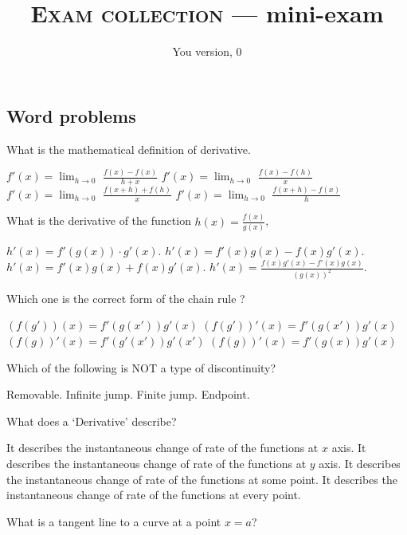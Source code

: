 \documentclass{exam}
\newcommand\myversion{0}
\begin{document}
\author{You version, \myversion}
\title{\textsc{Exam collection} --- mini-exam}


\maketitle


\begin{questions}

\section{Word problems}

	\question What is the mathematical definition of derivative.

	\begin{choices}
		\choice $f'(x) = \lim_{h\to 0}$ $\frac{f(x)-f(x)}{h+x}$
		\choice $f'(x) = \lim_{h\to 0}$ $\frac{f(x)-f(h)}{x}$
		\choice $f'(x) = \lim_{h\to 0}$ $\frac{f(x+h)+f(h)}{x}$
		\CorrectChoice $f'(x) = \lim_{h\to 0}$ $\frac{f(x+h)-f(x)}{h}$
	\end{choices}
	\question What is the derivative of the function $h(x) = \frac{f(x)}{g(x)}$,

	\begin{choices}
		\choice $h'(x) = f'(g(x)) \cdot g'(x).$
		\choice $h'(x) = f'(x)g(x)-f(x)g'(x).$
		\choice $h'(x) = f'(x)g(x)+f(x)g'(x).$
		\CorrectChoice $h'(x) = \frac{f(x)g'(x)-f'(x)g(x)}{(g(x))^2}.$
	\end{choices}

	\question Which one is the correct form of the chain rule ?

	\begin{choices}
		\choice $(f(g'))(x)=f'(g(x'))g'(x)$
		\choice $(f(g'))'(x)=f'(g(x'))g'(x)$
		\choice $(f(g))'(x)=f'(g'(x'))g'(x')$
		\CorrectChoice $(f(g))'(x)=f'(g(x))g'(x)$
	\end{choices}

	\question Which of the following is NOT a type of discontinuity?

	\begin{choices}
		\choice Removable.
		\choice Infinite jump.
		\choice Finite jump.
		\CorrectChoice Endpoint.
	\end{choices}

	\question What does a `Derivative' describe?
	\begin{choices}
		\choice It describes the instantaneous change of rate of the functions at $x$ axis.
		\choice It describes the instantaneous change of rate of the functions at $y$ axis.
		\choice It describes the instantaneous change of rate of the functions at some point.
		\CorrectChoice It describes the instantaneous change of rate of the functions at every point.
	\end{choices}
	\question What is a tangent line to a curve at a point $x = a$?


\end{questions}
\end{document}
